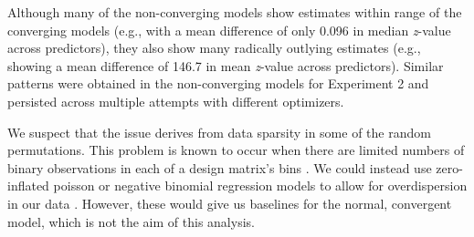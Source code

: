 \documentclass[authoryear, 12pt]{elsarticle}
\begin{document}
Although many of the non-converging models show estimates within range of the converging models (e.g., with a mean difference of only 0.096 in median \textit{z}-value across predictors), they also show many radically outlying estimates (e.g., showing a mean difference of 146.7 in mean \textit{z}-value across predictors). Similar patterns were obtained in the non-converging models for Experiment 2 and persisted across multiple attempts with different optimizers.

We suspect that the issue derives from data sparsity in some of the random permutations. This problem is known to occur when there are limited numbers of binary observations in each of a design matrix's bins \citep{allison2004}. We could instead use zero-inflated poisson or negative binomial regression models to allow for overdispersion in our data \citep{allison2012}. However, these would give us baselines for the normal, convergent model, which is not the aim of this analysis.
\end{document}
